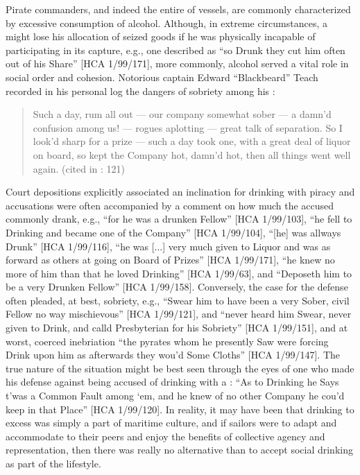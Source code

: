 Pirate commanders, and indeed the entire  of  vessels, are commonly characterized by excessive consumption of alcohol. Although, in extreme circumstances, a  might lose his allocation of seized goods if he was physically incapable of participating in its capture, e.g., one  described as “so Drunk they cut him often out of his Share” [HCA 1/99/171], more commonly, alcohol served a vital role in social order and cohesion. Notorious  captain Edward “Blackbeard” Teach recorded in his personal log the dangers of sobriety among his :

\begin{quotation}
Such a day, rum all out — our company somewhat sober — a damn’d confusion among us! — rogues aplotting — great talk of separation. So I look’d sharp for a prize — such a day took one, with a great deal of liquor on board, so kept the Company hot, damn’d hot, then all things went well again. (cited in \citealt{Bicheno2012}: 121)
\end{quotation}

Court depositions explicitly associated an inclination for drinking with piracy and accusations were often accompanied by a comment on how much the accused commonly drank, e.g., “for he was a drunken Fellow” [HCA 1/99/103], “he fell to Drinking and became one of the Company” [HCA 1/99/104], “[he] was allways Drunk” [HCA 1/99/116], “he was [...] very much given to Liquor and was as forward as others at going on Board of Prizes” [HCA 1/99/171], “he knew no more of him than that he loved Drinking” [HCA 1/99/63], and “Deposeth him to be a very Drunken Fellow” [HCA 1/99/158]. Conversely, the case for the defense often pleaded, at best, sobriety, e.g., “Swear him to have been a very Sober, civil Fellow no way mischievous” [HCA 1/99/121], and “never heard him Swear, never given to Drink, and calld Presbyterian for his Sobriety” [HCA 1/99/151], and at worst, coerced inebriation “the pyrates whom he presently Saw were forcing Drink upon him as afterwards they wou’d Some Cloths” [HCA 1/99/147]. The true nature of the situation might be best seen through the eyes of one  who made his defense against being accused of drinking with a  : “As to Drinking he Says t’was a Common Fault among ‘em, and he knew of no other Company he cou’d keep in that Place” [HCA 1/99/120]. In reality, it may have been that drinking to excess was simply a part of maritime culture, and if sailors were to adapt and accommodate to their peers and enjoy the benefits of collective agency and representation, then there was really no alternative than to accept social drinking as part of the lifestyle.  

